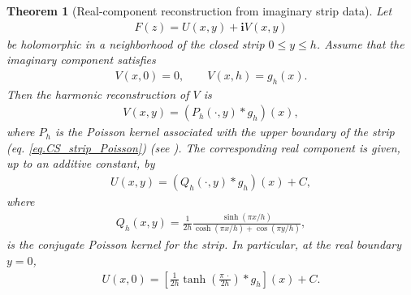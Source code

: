 \documentclass[11pt]{article}
\newtheorem{theorem}{Theorem}[section]
\newcommand{\imag}{\textbf{i}}
\begin{document}
\begin{theorem}[Real-component reconstruction from imaginary strip data]
	Let
	\begin{align*}
		F(z)=U(x,y)+\imag V(x,y)
	\end{align*}
	be holomorphic in a neighborhood of the closed strip
	\(0\leq y\leq h\). Assume that the imaginary component satisfies
	\begin{align*}
		V(x,0)=0,
		\qquad
		V(x,h)=g_h(x).
	\end{align*}
	Then the harmonic reconstruction of \(V\) is
	\begin{align*}
		V(x,y)
		=
		\left(P_h(\cdot,y)*g_h\right)(x),
	\end{align*}
	where \(P_h\) is the Poisson kernel associated with the upper
	boundary of the strip (eq. \eqref{eq.CS_strip_Poisson}) (see \cite{widder1961functions}). The corresponding real component is given,
	up to an additive constant, by
	\begin{align*}
		U(x,y)
		=
		\left(Q_h(\cdot,y)*g_h\right)(x)+C,
	\end{align*}
	where
	\begin{align*}
		Q_h(x,y)
		=
		\frac{1}{2h}
		\frac{\sinh(\pi x/h)}
		{\cosh(\pi x/h)+\cos(\pi y/h)} ,
	\end{align*}
	is the conjugate Poisson kernel for the strip. In particular, at the
	real boundary \(y=0\),
	\begin{align}
		U(x,0)
		=
		\left[
		\frac{1}{2h}
		\tanh\left(
		\frac{\pi\,\cdot}{2h}
		\right)
		*g_h
		\right](x)+C.
	\end{align}
\end{theorem}
  
\end{document}
